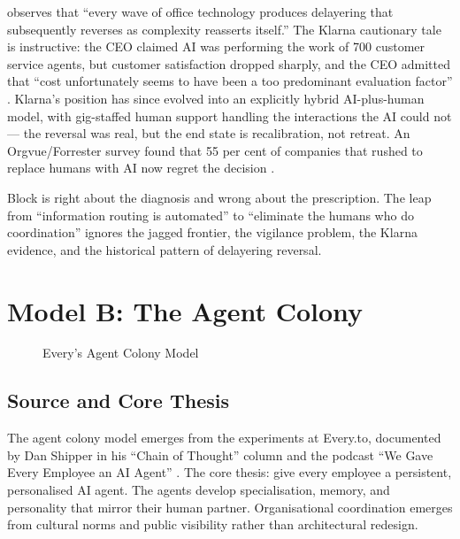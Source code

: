 \textcite{Spicer2026} observes that ``every wave of office technology produces delayering that subsequently reverses as complexity reasserts itself.'' The Klarna cautionary tale is instructive: the CEO claimed AI was performing the work of 700 customer service agents, but customer satisfaction dropped sharply, and the CEO admitted that ``cost unfortunately seems to have been a too predominant evaluation factor'' \parencite{Klarna2025}. Klarna's position has since evolved into an explicitly hybrid AI-plus-human model, with gig-staffed human support handling the interactions the AI could not \parencite{KlarnaHybrid2026} --- the reversal was real, but the end state is recalibration, not retreat. An Orgvue/Forrester survey found that 55 per cent of companies that rushed to replace humans with AI now regret the decision \parencite{OrgvueForrester2025}.

\begin{cautionbox}
Block is right about the diagnosis and wrong about the prescription. The leap from ``information routing is automated'' to ``eliminate the humans who do coordination'' ignores the jagged frontier, the vigilance problem, the Klarna evidence, and the historical pattern of delayering reversal.
\end{cautionbox}

\section{Model B: The Agent Colony}

\begin{figure}[h]
\centering
{}
\caption{Every's Agent Colony Model}
\label{fig:agent-colony}
\end{figure}

\subsection{Source and Core Thesis}

The agent colony model emerges from the experiments at Every.to, documented by Dan Shipper in his ``Chain of Thought'' column and the podcast ``We Gave Every Employee an AI Agent'' \parencite{Shipper2026, Klaassen2025}. The core thesis: give every employee a persistent, personalised AI agent. The agents develop specialisation, memory, and personality that mirror their human partner. Organisational coordination emerges from cultural norms and public visibility rather than architectural redesign.

